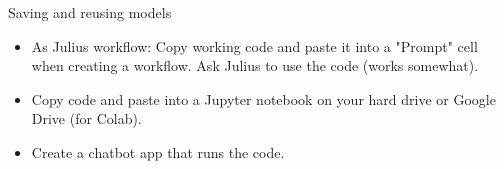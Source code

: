 \documentclass[10pt]{beamer}
\begin{document}
\begin{frame}{Saving and reusing models}
\begin{itemize}
\item As Julius workflow: Copy working code and paste it into a "Prompt" cell when creating a workflow.  Ask Julius to use the code (works somewhat).
\item Copy code and paste into a Jupyter notebook on your hard drive or Google Drive (for Colab).
\item Create a chatbot app that runs the code.
\end{itemize}
\end{frame}
\end{document}
